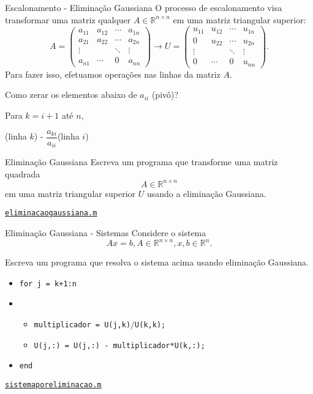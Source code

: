 \documentclass[hyperref={pdfpagelabels=false}]{beamer}
\begin{document}
\begin{frame}{Escalonamento - Eliminação Gaussiana}
   O processo de escalonamento visa transformar uma matriz qualquer $A\in {\mathbb{R}}^{n\times n}$ em uma matriz triangular superior:
   $$A = \begin{pmatrix}
     a_{11} & a_{12} & \cdots & a_{1n}\\
     a_{21} & a_{22} & \cdots & a_{2n}\\
     \vdots & & \ddots & \vdots \\
     a_{n1} & \cdots & 0 & a_{nn}
   \end{pmatrix}
   \rightarrow U = 
   \begin{pmatrix}
     u_{11} & u_{12} & \cdots & u_{1n}\\
     0 & u_{22} & \cdots & u_{2n}\\
     \vdots & & \ddots & \vdots \\
     0 & \cdots & 0 & u_{nn}
   \end{pmatrix}.$$
   Para fazer isso, efetuamos operações nas linhas da matriz $A$.

   Como zerar os elementos abaixo de $a_{ii}$ (pivô)?

   Para $k=i+1$ até $n$, \begin{center}(linha $k$) - $\dfrac{a_{ki}}{a_{ii}}$(linha $i$)\end{center}
\end{frame}

\begin{frame}{Eliminação Gaussiana}
   Escreva um programa que transforme uma matriz quadrada
   $$A \in {\mathbb{R}}^{n\times n}$$
   em uma matriz triangular superior $U$ usando a eliminação Gaussiana.
   \vfill
   \begin{center}
     \href{listings/eliminacaogaussiana.m}{\underline{\texttt{eliminacaogaussiana.m}}}
   \end{center}
\end{frame}

\begin{frame}{Eliminação Gaussiana - Sistemas}
   Considere o sistema 
   $$Ax=b, A\in {\mathbb{R}}^{n\times n}, x,b\in {\mathbb{R}}^n.$$

   Escreva um programa que resolva o sistema acima usando eliminação Gaussiana.
   \begin{itemize}
      \item[] \texttt{for j = k+1:n}
      \item[] 
      \begin{itemize}
         \item[] \texttt{multiplicador = U(j,k)$/$U(k,k);}
         \item[] \texttt{U(j,:) = U(j,:) - multiplicador*U(k,:);}
      \end{itemize}
      \item[] \texttt{end}
   \end{itemize}
   \begin{center}
     \href{listings/sistemaporeliminacao.m}{\underline{\texttt{sistemaporeliminacao.m}}}
   \end{center}
\end{frame}
\end{document}
